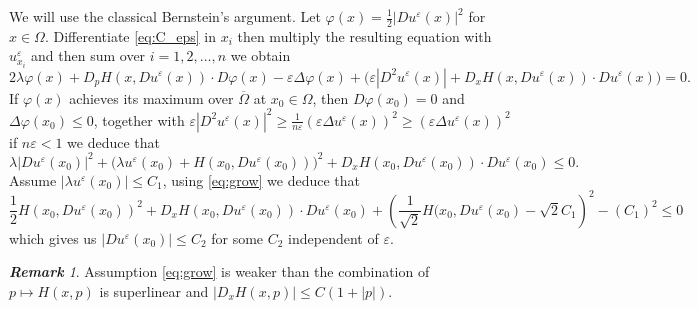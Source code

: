 \documentclass[11pt,reqno]{amsart}
\numberwithin{figure}{section}
\theoremstyle{plain}
\theoremstyle{remark}
\newtheorem{rem}{\bf{Remark}}
\numberwithin{equation}{section}
\begin{document}
\begin{appendices}
\noindent We will use the classical Bernstein's argument. Let $\varphi(x) = \frac{1}{2}|Du^\varepsilon(x)|^2$ for $x\in \Omega$. Differentiate \eqref{eq:C_eps} in $x_i$ then multiply the resulting equation with $u^\varepsilon_{x_i}$ and then sum over $i=1,2,\ldots, n$ we obtain 
\begin{equation*}
    2\lambda \varphi(x) + D_pH(x,Du^\varepsilon(x))\cdot D\varphi(x) - \varepsilon \Delta \varphi(x) + \Big(\varepsilon |D^2u^\varepsilon(x)| + D_xH(x,Du^\varepsilon(x))\cdot Du^\varepsilon(x)\Big) = 0.
\end{equation*}
If $\varphi(x)$ achieves its maximum over $\overline{\Omega}$ at $x_0\in \Omega$, then $D\varphi(x_0) = 0$ and $\Delta \varphi(x_0)\leq 0$, together with $\varepsilon |D^2u^\varepsilon(x)|^2\geq \frac{1}{n\varepsilon}(\varepsilon\Delta u^\varepsilon(x))^2\geq (\varepsilon\Delta u^\varepsilon(x))^2$ if $n\varepsilon < 1$ we deduce that
\begin{equation*}
    \lambda |D u^\varepsilon(x_0)|^2 + \Big(\lambda u^\varepsilon(x_0)+H(x_0,Du^\varepsilon(x_0))\Big)^2 + D_xH(x_0,Du^\varepsilon(x_0))\cdot Du^\varepsilon(x_0) \leq 0.
\end{equation*}
Assume $|\lambda u^\varepsilon(x_0)|\leq C_1$, using \eqref{eq:grow} we deduce that
\begin{equation*}
    \frac{1}{2}H(x_0,Du^\varepsilon(x_0))^2 + D_xH(x_0,Du^\varepsilon(x_0))\cdot Du^\varepsilon(x_0) + \left(\frac{1}{\sqrt{2}}H(x_0,Du^\varepsilon(x_0) - \sqrt{2}C_1\right)^2 - \left(C_1\right)^2\leq 0
\end{equation*}
which gives us $|Du^\varepsilon(x_0)|\leq C_2$ for some $C_2$ independent of $\varepsilon$. 
\begin{rem} Assumption \eqref{eq:grow} is weaker than the combination of $p\mapsto H(x,p)$ is superlinear and $|D_xH(x,p)|\leq C(1+|p|)$.
\end{rem}



\end{appendices}
\end{document}
